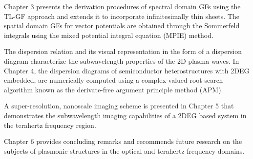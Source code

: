 Chapter 3 presents the derivation procedures of spectral domain GFs using the TL-GF approach \cite{Michalski1997,Michalski2005} and extends it to incorporate infinitesimally thin sheets. The spatial domain GFs for vector potentials are obtained through the Sommerfeld integrals using the mixed potential integral equation (MPIE) method.

The dispersion relation and its visual representation in the form of a dispersion diagram characterize the subwavelength properties of the 2D plasma waves. In Chapter 4, the dispersion diagrams of semiconductor heterostructures with 2DEG embedded, are numerically computed using a complex-valued root search algorithm known as the derivate-free argument principle method (APM).

A super-resolution, nanoscale imaging scheme is presented in Chapter 5 that demonstrates the subwavelength imaging capabilities of a 2DEG based system in the terahertz frequency region.

Chapter 6 provides concluding remarks and recommends future research on the subjects of plasmonic structures in the optical and terahertz frequency domains.
